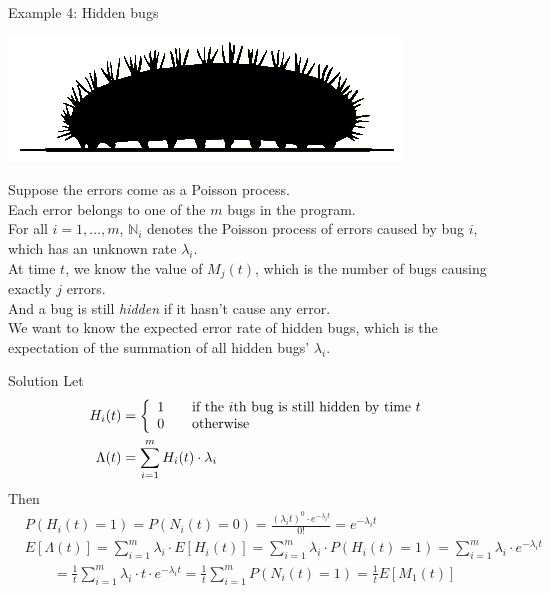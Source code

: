 \documentclass[mathserif]{beamer}
\begin{document}
\begin{frame}{Example 4: Hidden bugs}
\begin{center}
\includegraphics[scale=0.3]{bug.png}
\end{center}
Suppose the errors come as a Poisson process.\\
Each error belongs to one of the $m$ bugs in the program.\\
For all $i = 1,\ldots, m$, $\mathbb{N}_i$ denotes the Poisson process of errors caused by bug $i$, which has an unknown rate $\lambda_i$.\\
At time $t$, we know the value of $M_j(t)$, which is the number of bugs causing exactly $j$ errors.\\
And a bug is still \textit{hidden} if it hasn't cause any error.\\
We want to know the expected error rate of hidden bugs, 
which is the expectation of the summation of all hidden bugs' $\lambda_i$.
\end{frame}

\begin{frame}{Solution}
Let
\begin{align*}
H_i(t) & = \left\{
\begin{array}{l l}
1 & \quad\text{if the $i$th bug is still hidden by time $t$} \\
0 & \quad\text{otherwise} \\
\end{array}
\right. \\
\Lambda(t) & = \sum_{i=1}^m H_i(t)\cdot \lambda_i
\end{align*}
Then
\begin{align*}
& P(H_i(t)=1) = P(N_i(t)=0) = \frac{(\lambda_i t)^0 \cdot e^{-\lambda_i t}}{0!} = e^{-\lambda_i t} \\
& E[\Lambda(t)] = \sum_{i=1}^m \lambda_i\cdot E[H_i(t)]
	= \sum_{i=1}^m \lambda_i\cdot P(H_i(t) = 1) = \sum_{i=1}^m \lambda_i\cdot e^{-\lambda_i t} \\
&\qquad = \frac{1}{t}\sum_{i=1}^m \lambda_i\cdot t\cdot e^{-\lambda_i t} = \frac{1}{t}\sum_{i=1}^m P(N_i(t) = 1)
	= \frac{1}{t} E[M_1(t)]
\end{align*}
\end{frame}
\end{document}
